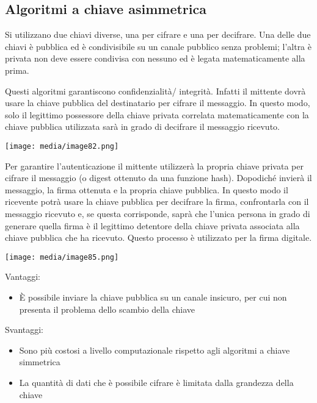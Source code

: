 \subsection{Algoritmi a chiave
asimmetrica}\label{algoritmi-a-chiave-asimmetrica}

Si utilizzano due chiavi diverse, una per cifrare e una per decifrare.
Una delle due chiavi è pubblica ed è condivisibile su un canale pubblico
senza problemi; l'altra è privata non deve essere condivisa con nessuno
ed è legata matematicamente alla prima.

Questi algoritmi garantiscono confidenzialità/ integrità. Infatti il
mittente dovrà usare la chiave pubblica del destinatario per cifrare il
messaggio. In questo modo, solo il legittimo possessore della chiave
privata correlata matematicamente con la chiave pubblica utilizzata sarà
in grado di decifrare il messaggio ricevuto.

\texttt{[image: media/image82.png]}

Per garantire l'autenticazione il mittente utilizzerà la propria chiave
privata per cifrare il messaggio (o digest ottenuto da una funzione
hash). Dopodiché invierà il messaggio, la firma ottenuta e la propria
chiave pubblica. In questo modo il ricevente potrà usare la chiave
pubblica per decifrare la firma, confrontarla con il messaggio ricevuto
e, se questa corrisponde, saprà che l'unica persona in grado di generare
quella firma è il legittimo detentore della chiave privata associata
alla chiave pubblica che ha ricevuto. Questo processo è utilizzato per
la firma digitale.

\texttt{[image: media/image85.png]}

Vantaggi:

\begin{itemize}
\item
  È possibile inviare la chiave pubblica su un canale insicuro, per cui
  non presenta il problema dello scambio della chiave
\end{itemize}

Svantaggi:

\begin{itemize}
\item
  Sono più costosi a livello computazionale rispetto agli algoritmi a
  chiave simmetrica
\item
  La quantità di dati che è possibile cifrare è limitata dalla grandezza
  della chiave
\end{itemize}

